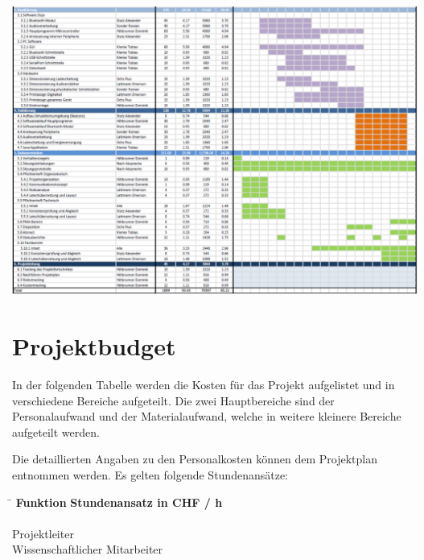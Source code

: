 \documentclass[10pt,a4paper,oneside]{99_fhnwreport}
\begin{document}
\begin{landscape}
\hspace*{-0.6cm}
\vspace*{2cm}
\includegraphics[height=\dimexpr\textheight-4\baselineskip\relax,page=1]{projektplan_2.pdf}
\end{landscape}
\newpage

\section{Projektbudget}\label{sec:projektbudget}
In der folgenden Tabelle  werden die Kosten für das Projekt aufgelistet und in verschiedene Bereiche aufgeteilt. Die zwei Hauptbereiche sind der Personalaufwand und der Materialaufwand, welche in weitere kleinere Bereiche aufgeteilt werden.

\noindent
Die detaillierten Angaben zu den Personalkosten können dem Projektplan entnommen werden. Es gelten folgende Stundenansätze:

\begin{tabbing}
\hspace{80mm}			\= 	\hspace{10mm} 	\kill
\textbf{Funktion}		\> \textbf{Stundenansatz in CHF / h} \\
\> \\
Projektleiter 			 	\\
Wissenschaftlicher Mitarbeiter 		\\
\end{tabbing}
\end{document}
